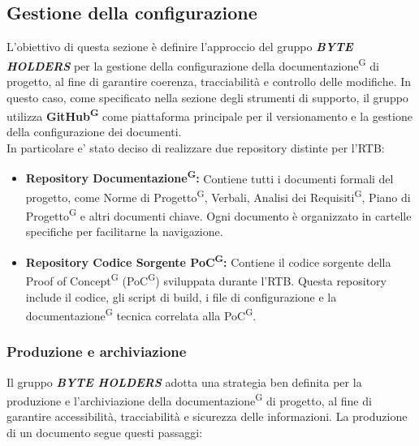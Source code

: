\documentclass[a4paper, 11pt]{article}
\begin{document}
\subsection{Gestione della configurazione}

L'obiettivo di questa sezione è definire l'approccio del gruppo \textbf{\textit{BYTE HOLDERS}} per la gestione della configurazione della documentazione\textsuperscript{G} di progetto, al fine di garantire coerenza, tracciabilità e controllo delle modifiche.
In questo caso, come specificato nella sezione degli strumenti di supporto, il gruppo utilizza \textbf{GitHub\textsuperscript{G}} come piattaforma principale per il versionamento e la gestione della configurazione dei documenti.
\\
In particolare e' stato deciso di realizzare due repository distinte per l'RTB:
\begin{itemize}
    \item \textbf{Repository Documentazione\textsuperscript{G}:} Contiene tutti i documenti formali del progetto, come Norme di Progetto\textsuperscript{G}, Verbali, Analisi dei Requisiti\textsuperscript{G}, Piano di Progetto\textsuperscript{G} e altri documenti chiave. Ogni documento è organizzato in cartelle specifiche per facilitarne la navigazione. 
    \item \textbf{Repository Codice Sorgente PoC\textsuperscript{G}:} Contiene il codice sorgente della Proof of Concept\textsuperscript{G} (PoC\textsuperscript{G}) sviluppata durante l'RTB. Questa repository include il codice, gli script di build, i file di configurazione e la documentazione\textsuperscript{G} tecnica correlata alla PoC\textsuperscript{G}.
\end{itemize}

\subsubsection{Produzione e archiviazione}
Il gruppo \textbf{\textit{BYTE HOLDERS}} adotta una strategia ben definita per la produzione e l'archiviazione della documentazione\textsuperscript{G} di progetto, al fine di garantire accessibilità, tracciabilità e sicurezza delle informazioni.
La produzione di un documento segue questi passaggi:
\end{document}
